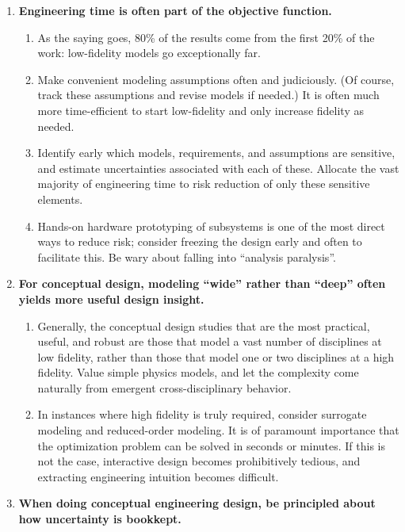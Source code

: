 \begin{enumerate}
    \item \textbf{Engineering time is often part of the objective function.}
    \begin{enumerate}
        \item As the saying goes, 80\% of the results come from the first 20\% of the work: low-fidelity models go exceptionally far.
        \item Make convenient modeling assumptions often and judiciously. (Of course, track these assumptions and revise models if needed.) It is often much more time-efficient to start low-fidelity and only increase fidelity as needed.
        \item Identify early which models, requirements, and assumptions are sensitive, and estimate uncertainties associated with each of these. Allocate the vast majority of engineering time to risk reduction of only these sensitive elements.
        \item Hands-on hardware prototyping of subsystems is one of the most direct ways to reduce risk; consider freezing the design early and often to facilitate this. Be wary about falling into ``analysis paralysis''.
    \end{enumerate}
    \item \textbf{For conceptual design, modeling ``wide'' rather than ``deep'' often yields more useful design insight.}
    \begin{enumerate}
        \item Generally, the conceptual design studies that are the most practical, useful, and robust are those that model a vast number of disciplines at low fidelity, rather than those that model one or two disciplines at a high fidelity. Value simple physics models, and let the complexity come naturally from emergent cross-disciplinary behavior.
        \item In instances where high fidelity is truly required, consider surrogate modeling and reduced-order modeling. It is of paramount importance that the optimization problem can be solved in seconds or minutes. If this is not the case, interactive design becomes prohibitively tedious, and extracting engineering intuition becomes difficult.
    \end{enumerate}
    \item \textbf{When doing conceptual engineering design, be principled about how uncertainty is bookkept.}
    \begin{enumerate}

\end{enumerate}
\end{enumerate}

